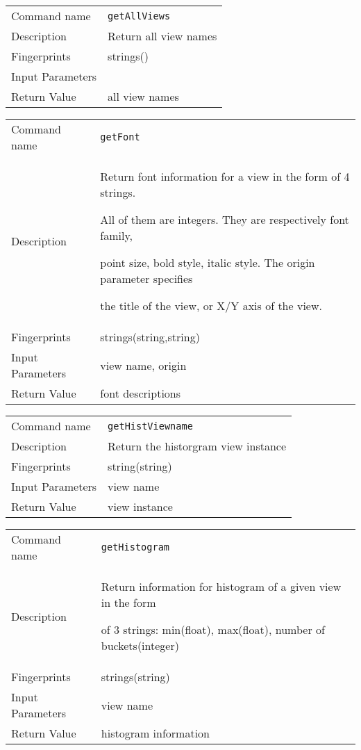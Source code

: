 \noindent
\begin{tabular}{l|p{5in}}
\hline
Command name &{\tt getAllViews }\\ 
Description &
Return all view names
 	\\
Fingerprints & strings()\\
Input Parameters&\\
Return Value&all view names\\
\hline
\end{tabular}
\bigskip

\noindent
\begin{tabular}{l|p{5in}}
\hline
Command name &{\tt getFont }\\ 
Description &
Return font information for a view in the form of 4 strings. 
 
All of them are integers. They are respectively font family,
 
point size, bold style, italic style. The origin parameter specifies
 
the title of the view, or X/Y axis of the view.
 	\\
Fingerprints & strings(string,string)\\
Input Parameters&view name, origin\\
Return Value&font descriptions\\
\hline
\end{tabular}
\bigskip

\noindent
\begin{tabular}{l|p{5in}}
\hline
Command name &{\tt getHistViewname }\\ 
Description &
Return the historgram view instance 
 	\\
Fingerprints & string(string)\\
Input Parameters&view name\\
Return Value&view instance\\
\hline
\end{tabular}
\bigskip

\noindent
\begin{tabular}{l|p{5in}}
\hline
Command name &{\tt getHistogram }\\ 
Description &
Return information for histogram of a given view in the form 
 
of 3 strings: min(float), max(float), number of buckets(integer)
 	\\
Fingerprints & strings(string)\\
Input Parameters&view name\\
Return Value&histogram information\\
\hline
\end{tabular}
\bigskip

